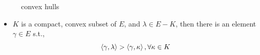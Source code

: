 \begin{itemize}
	\begin{figure}[H]
		\centering
		\caption{convex hulls}
	\end{figure}
	
	\begin{itemize}
		\item $K$ is a compact, convex subset of $E$, and $\lambda \in E - K$, then there is an element $\gamma \in E$ s.t.,
		\begin{equation}
			\braket{\gamma, \lambda} > \braket{\gamma, \kappa}, \forall \kappa \in K
		\end{equation}
		

\end{itemize}
\end{itemize}
